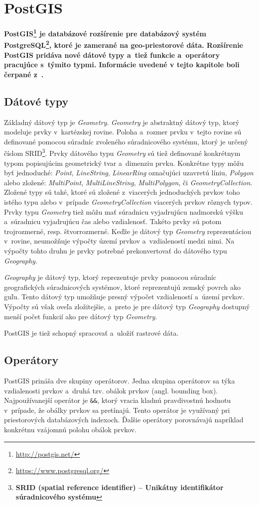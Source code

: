 \section{PostGIS}
\label{postgis}
\bf PostGIS\rm\footnote{\url{http://postgis.net/}} je databázové rozšírenie pre databázový systém \bf PostgreSQL\rm\footnote{\url{https://www.postgresql.org/}}, ktoré je zamerané na geo-priestorové dáta. Rozšírenie PostGIS pridáva nové dátové typy a~tiež funkcie a~operátory pracujúce s~týmito typmi. Informácie uvedené v tejto kapitole boli čerpané z~\cite{postgis}.

\subsection*{Dátové typy}
Základný dátový typ je {\it Geometry}. {\it Geometry} je abstraktný dátový typ, ktorý modeluje prvky v~kartézskej rovine. Poloha a~rozmer prvku v~tejto rovine sú definované pomocou súradníc zvoleného súradnicového systému, ktorý je určený číslom SRID\footnote{\bf SRID \rm (spatial reference identifier) -- Unikátny identifikátor súradnicového systému}. Prvky dátového typu {\it Geometry} sú tiež definované konkrétnym typom popisujúcim geometrický tvar a~dimenziu prvku. Konkrétne typy môžu byť jednoduché: {\it Point}, {\it LineString}, {\it LinearRing} označujúci uzavretú líniu, {\it Polygon} alebo zložené: {\it MultiPoint}, {\it MultiLineString}, {\it MultiPolygon}, či {\it GeometryCollection}. Zložené typy sú také, ktoré sú zložené z~viacerých jednoduchých prvkov toho istého typu alebo v~prípade {\it GeometryCollection} viacerých prvkov rôznych typov. Prvky typu {\it Geometry} tiež môžu mať súradnicu vyjadrujúcu nadmorskú výšku a~súradnicu vyjadrujúcu čas alebo vzdialenosť. Takéto prvky sú potom trojrozmerné, resp. štvorrozmerné. Keďže je dátový typ {\it Geometry} reprezentáciou v~rovine, neumožňuje výpočty území prvkov a~vzdialeností medzi nimi. Na výpočty tohto druhu je prvky potrebné prekonvertovať do dátového typu {\it Geography}.

{\it Geography} je dátový typ, ktorý reprezentuje prvky pomocou súradníc geografických súradnicových systémov, ktoré reprezentujú zemský povrch ako guľu. Tento dátový typ umožňuje presný výpočet vzdialeností a~území prvkov. Výpočty sú však oveľa zložitejšie, a~preto je pre dátový typ {\it Geography} dostupný menší počet funkcií ako pre dátový typ {\it Geometry}.

PostGIS je tiež schopný spracovať a~uložiť rastrové dáta.

\subsection*{Operátory}
PostGIS prináša dve skupiny operátorov. Jedna skupina operátorov sa týka vzdialenosti prvkov a~druhá tzv. obálok prvkov (angl. bounding box). Najpoužívanejší operátor je {\tt \&\&}, ktorý vracia kladnú pravdivostnú hodnotu v~prípade, že obálky prvkov sa pretínajú. Tento operátor je využívaný pri priestorových databázových indexoch. Ďalšie operátory porovnávajú napríklad konkrétnu vzájomnú polohu obálok prvkov.

